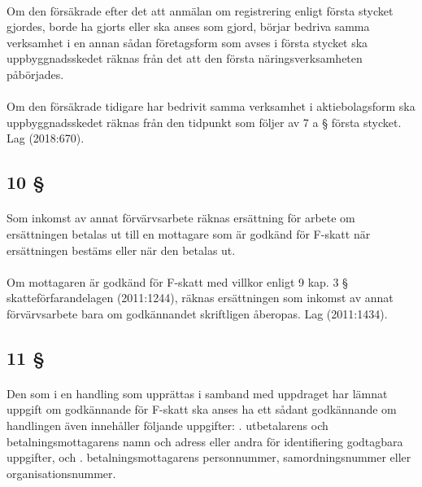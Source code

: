 \documentclass[a4paper,notitlepage,openany,10pt]{book}
\begin{document}
\paragraph*{}
Om den försäkrade efter det att anmälan om registrering enligt första stycket gjordes, borde ha gjorts eller ska anses som gjord, börjar bedriva samma verksamhet i en annan sådan företagsform som avses i första stycket ska uppbyggnadsskedet räknas från det att den första näringsverksamheten påbörjades.
\paragraph*{}
Om den försäkrade tidigare har bedrivit samma verksamhet i aktiebolagsform ska uppbyggnadsskedet räknas från den tidpunkt som följer av 7 a § första stycket.
Lag (2018:670).
\subsection*{10 §}
\paragraph*{}
Som inkomst av annat förvärvsarbete räknas ersättning för arbete om ersättningen betalas ut till en mottagare som är godkänd för F-skatt när ersättningen bestäms eller när den betalas ut.
\paragraph*{}
Om mottagaren är godkänd för F-skatt med villkor enligt 9 kap. 3 § skatteförfarandelagen (2011:1244), räknas ersättningen som inkomst av annat förvärvsarbete bara om godkännandet skriftligen åberopas.
Lag (2011:1434).
\subsection*{11 §}
\paragraph*{}
Den som i en handling som upprättas i samband med uppdraget har lämnat uppgift om godkännande för F-skatt ska anses ha ett sådant godkännande om handlingen även innehåller följande uppgifter:
. utbetalarens och betalningsmottagarens namn och adress eller andra för identifiering godtagbara uppgifter, och
. betalningsmottagarens personnummer, samordningsnummer eller organisationsnummer.
\end{document}

